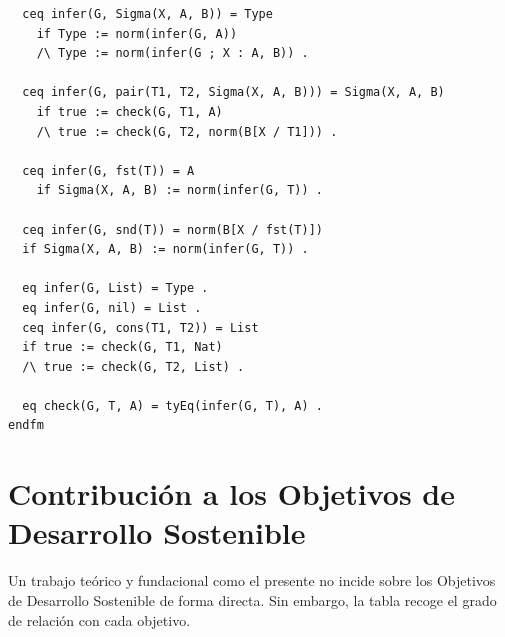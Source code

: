 \begin{lstlisting}
  ceq infer(G, Sigma(X, A, B)) = Type
    if Type := norm(infer(G, A))
    /\ Type := norm(infer(G ; X : A, B)) .

  ceq infer(G, pair(T1, T2, Sigma(X, A, B))) = Sigma(X, A, B)
    if true := check(G, T1, A)
    /\ true := check(G, T2, norm(B[X / T1])) .

  ceq infer(G, fst(T)) = A
    if Sigma(X, A, B) := norm(infer(G, T)) .

  ceq infer(G, snd(T)) = norm(B[X / fst(T)])
  if Sigma(X, A, B) := norm(infer(G, T)) .

  eq infer(G, List) = Type .
  eq infer(G, nil) = List .
  ceq infer(G, cons(T1, T2)) = List
  if true := check(G, T1, Nat)
  /\ true := check(G, T2, List) .

  eq check(G, T, A) = tyEq(infer(G, T), A) .
endfm
\end{lstlisting}
\chapter{Contribución a los Objetivos de Desarrollo Sostenible}\label{ap:ods}

\indent Un trabajo teórico y fundacional como el presente no incide sobre los
Objetivos de Desarrollo Sostenible de forma directa. Sin embargo, la tabla recoge el
grado de relación con cada objetivo.

